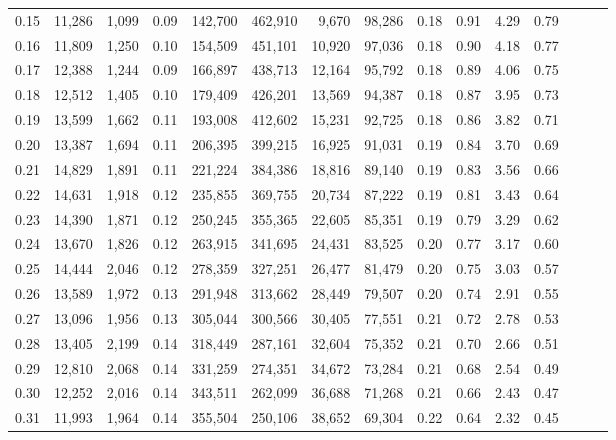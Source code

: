 \begin{tabular}{rrrrrrrrrrrrrrr}
0.15 &  11,286 &  1,099 &  0.09 &  142,700 &  462,910 &    9,670 &   98,286 &  0.18 &  0.91 &  4.29 &      0.79 \\
0.16 &  11,809 &  1,250 &  0.10 &  154,509 &  451,101 &   10,920 &   97,036 &  0.18 &  0.90 &  4.18 &      0.77 \\
0.17 &  12,388 &  1,244 &  0.09 &  166,897 &  438,713 &   12,164 &   95,792 &  0.18 &  0.89 &  4.06 &      0.75 \\
0.18 &  12,512 &  1,405 &  0.10 &  179,409 &  426,201 &   13,569 &   94,387 &  0.18 &  0.87 &  3.95 &      0.73 \\
0.19 &  13,599 &  1,662 &  0.11 &  193,008 &  412,602 &   15,231 &   92,725 &  0.18 &  0.86 &  3.82 &      0.71 \\
0.20 &  13,387 &  1,694 &  0.11 &  206,395 &  399,215 &   16,925 &   91,031 &  0.19 &  0.84 &  3.70 &      0.69 \\
0.21 &  14,829 &  1,891 &  0.11 &  221,224 &  384,386 &   18,816 &   89,140 &  0.19 &  0.83 &  3.56 &      0.66 \\
0.22 &  14,631 &  1,918 &  0.12 &  235,855 &  369,755 &   20,734 &   87,222 &  0.19 &  0.81 &  3.43 &      0.64 \\
0.23 &  14,390 &  1,871 &  0.12 &  250,245 &  355,365 &   22,605 &   85,351 &  0.19 &  0.79 &  3.29 &      0.62 \\
0.24 &  13,670 &  1,826 &  0.12 &  263,915 &  341,695 &   24,431 &   83,525 &  0.20 &  0.77 &  3.17 &      0.60 \\
0.25 &  14,444 &  2,046 &  0.12 &  278,359 &  327,251 &   26,477 &   81,479 &  0.20 &  0.75 &  3.03 &      0.57 \\
0.26 &  13,589 &  1,972 &  0.13 &  291,948 &  313,662 &   28,449 &   79,507 &  0.20 &  0.74 &  2.91 &      0.55 \\
0.27 &  13,096 &  1,956 &  0.13 &  305,044 &  300,566 &   30,405 &   77,551 &  0.21 &  0.72 &  2.78 &      0.53 \\
0.28 &  13,405 &  2,199 &  0.14 &  318,449 &  287,161 &   32,604 &   75,352 &  0.21 &  0.70 &  2.66 &      0.51 \\
0.29 &  12,810 &  2,068 &  0.14 &  331,259 &  274,351 &   34,672 &   73,284 &  0.21 &  0.68 &  2.54 &      0.49 \\
0.30 &  12,252 &  2,016 &  0.14 &  343,511 &  262,099 &   36,688 &   71,268 &  0.21 &  0.66 &  2.43 &      0.47 \\
0.31 &  11,993 &  1,964 &  0.14 &  355,504 &  250,106 &   38,652 &   69,304 &  0.22 &  0.64 &  2.32 &      0.45 \\

\end{tabular}
